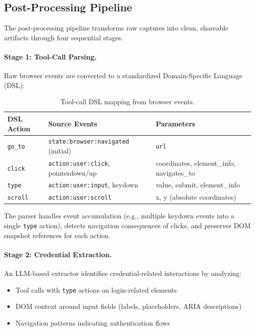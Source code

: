 \documentclass[letterpaper]{article}
\begin{document}
\subsection{Post-Processing Pipeline}

The post-processing pipeline transforms raw captures into clean, shareable artifacts through four sequential stages.

\paragraph{Stage 1: Tool-Call Parsing.} Raw browser events are converted to a standardized Domain-Specific Language (DSL):

\begin{table}[t]
\caption{Tool-call DSL mapping from browser events.}
\small
\centering
\begin{tabular}{@{}lll@{}}
\toprule
\textbf{DSL Action} & \textbf{Source Events} & \textbf{Parameters} \\
\midrule
\texttt{go\_to} & \texttt{state:browser:navigated} (initial) & \texttt{url} \\
\texttt{click} & \texttt{action:user:click}, pointerdown/up & coordinates, element\_info, navigates\_to \\
\texttt{type} & \texttt{action:user:input}, keydown & value, submit, element\_info \\
\texttt{scroll} & \texttt{action:user:scroll} & x, y (absolute coordinates) \\
\bottomrule
\end{tabular}
\end{table}

The parser handles event accumulation (e.g., multiple keydown events into a single \texttt{type} action), detects navigation consequences of clicks, and preserves DOM snapshot references for each action.

\paragraph{Stage 2: Credential Extraction.} An LLM-based extractor identifies credential-related interactions by analyzing:

\begin{itemize}
    \item Tool calls with \texttt{type} actions on login-related elements
    \item DOM context around input fields (labels, placeholders, ARIA descriptions)
    \item Navigation patterns indicating authentication flows
\end{itemize}
\end{document}
